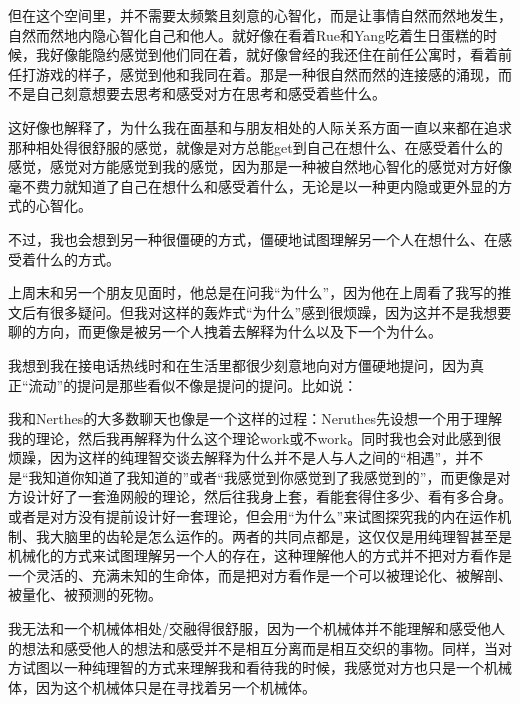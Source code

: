但在这个空间里，并不需要太频繁且刻意的心智化，而是让事情自然而然地发生，自然而然地内隐心智化自己和他人。就好像在看着Rue和Yang吃着生日蛋糕的时候，我好像能隐约感觉到他们同在着，就好像曾经的我还住在前任公寓时，看着前任打游戏的样子，感觉到他和我同在着。那是一种很自然而然的连接感的涌现，而不是自己刻意想要去思考和感受对方在思考和感受着些什么。

这好像也解释了，为什么我在面基和与朋友相处的人际关系方面一直以来都在追求那种相处得很舒服的感觉，就像是对方总能get到自己在想什么、在感受着什么的感觉，感觉对方能感觉到我的感觉，因为那是一种被自然地心智化的感觉\pozhehao{}对方好像毫不费力就知道了自己在想什么和感受着什么，无论是以一种更内隐或更外显的方式的心智化。

不过，我也会想到另一种很僵硬的方式，僵硬地试图理解另一个人在想什么、在感受着什么的方式。

上周末和另一个朋友见面时，他总是在问我“为什么”，因为他在上周看了我写的推文后有很多疑问。但我对这样的轰炸式“为什么”感到很烦躁，因为这并不是我想要聊的方向，而更像是被另一个人拽着去解释为什么以及下一个为什么。

我想到我在接电话热线时和在生活里都很少刻意地向对方僵硬地提问，因为真正“流动”的提问是那些看似不像是提问的提问。比如说：


我和Nerthes的大多数聊天也像是一个这样的过程：Neruthes先设想一个用于理解我的理论，然后我再解释为什么这个理论work或不work。同时我也会对此感到很烦躁，因为这样的纯理智交谈\pozhehao{}去解释为什么\pozhehao{}并不是人与人之间的“相遇”，并不是“我知道你知道了我知道的”或者“我感觉到你感觉到了我感觉到的”，而更像是对方设计好了一套渔网般的理论，然后往我身上套，看能套得住多少、看有多合身。或者是对方没有提前设计好一套理论，但会用“为什么”来试图探究我的内在运作机制、我大脑里的齿轮是怎么运作的。两者的共同点都是，这仅仅是用纯理智甚至是机械化的方式来试图理解另一个人的存在，这种理解他人的方式并不把对方看作是一个灵活的、充满未知的生命体，而是把对方看作是一个可以被理论化、被解剖、被量化、被预测的死物。

我无法和一个机械体相处/交融得很舒服，因为一个机械体并不能理解和感受他人的想法和感受\pozhehao{}他人的想法和感受并不是相互分离而是相互交织的事物。同样，当对方试图以一种纯理智的方式来理解我和看待我的时候，我感觉对方也只是一个机械体，因为这个机械体只是在寻找着另一个机械体。
